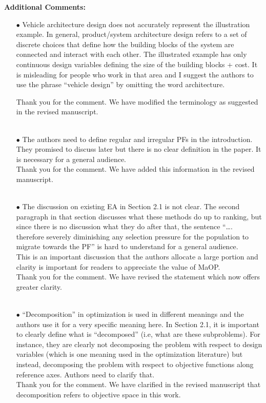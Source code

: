 \documentclass[onecolumn,10pt]{asme2ej}
\begin{document}
\textbf{Additional Comments:} 
\begin{itemize}

\item[$\bullet$] Vehicle architecture design does not accurately represent the illustration example. In general, product/system architecture design refers to a set of discrete choices that define how the building blocks of the system are connected and interact with each other. The illustrated example has only continuous design variables defining the size of the building blocks + cost. It is misleading for people who work in that area and I suggest the authors to use the phrase “vehicle design” by omitting the word architecture. 

{\color{blue}
Thank you for the comment. We have modified the terminology as suggested in the revised manuscript. \\
}\\


\item[$\bullet$] The authors need to define regular and irregular PFs in the introduction. They promised to discuss later but there is no clear definition in the paper. It is necessary for a general audience. \\

{\color{blue}
Thank you for the comment. We have added this information in the revised manuscript. \\
}\\

\item[$\bullet$] The discussion on existing EA in Section 2.1 is not clear. The second paragraph in that section discusses what these methods do up to ranking, but since there is no discussion what they do after that, the sentence “…. therefore severely diminishing any selection pressure for the population to migrate towards the PF” is hard to understand for a general audience.\\ This is an important discussion that the authors allocate a large portion and clarity is important for readers to appreciate the value of MaOP. \\
{\color{blue}
Thank you for the comment. We have revised the statement which now offers greater clarity.\\
}\\

\item[$\bullet$] “Decomposition” in optimization is used in different meanings and the authors use it for a very specific meaning here. In Section 2.1, it is important to clearly define what is “decomposed” (i.e, what are these subproblems). For instance, they are clearly not decomposing the problem with respect to design variables (which is one meaning used in the optimization literature) but instead, decomposing the problem with respect to objective functions along reference axes. Authors need to clarify that. \\
{\color{blue}
Thank you for the comment. We have clarified in the revised manuscript that decomposition refers to objective space in this work. \\
}\\



\end{itemize}
\end{document}
